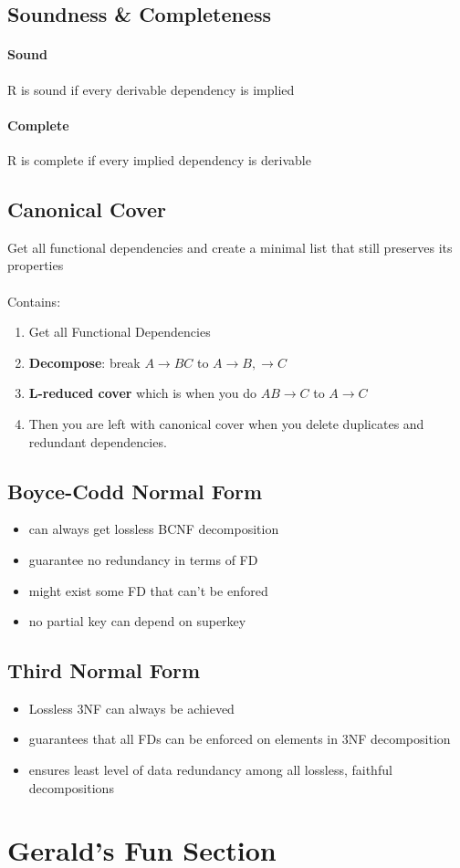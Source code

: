 \documentclass{article}
\newcommand\tab[1][0.5cm]{\hspace*{#1}}
\begin{document}
	\subsection{Soundness \& Completeness}
		\paragraph{Sound} R is sound if every derivable dependency is implied
		\paragraph{Complete} R is complete if every implied dependency is derivable

	\subsection{Canonical Cover}
		Get all functional dependencies and create a minimal list that still preserves its properties
		\\\\\tab Contains:
		\begin{enumerate}
			\item Get all Functional Dependencies
			\item \textbf{Decompose}: break $A \rightarrow BC$ to $A \rightarrow B,  \rightarrow C$
			\item \textbf{L-reduced cover} which is when you do $AB \rightarrow C$ to $A \rightarrow C$
			\item Then you are left with canonical cover when you delete duplicates and redundant dependencies.
		\end{enumerate}

	\subsection{Boyce-Codd Normal Form}
		\begin{itemize}
			\item can always get lossless BCNF decomposition
			\item guarantee no redundancy in terms of FD
			\item might exist some FD that can't be enfored
			\item no partial key can depend on superkey
		\end{itemize}

	\subsection{Third Normal Form}
		\begin{itemize}
			\item Lossless 3NF can always be achieved
			\item guarantees that all FDs can be enforced on elements in 3NF decomposition
			\item ensures least level of data redundancy among all lossless, faithful decompositions
		\end{itemize}

\section{Gerald's Fun Section}
\end{document}
